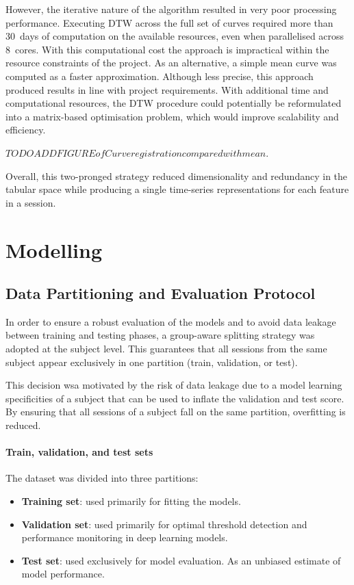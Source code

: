 However, the iterative nature of the algorithm resulted in very poor processing performance. Executing DTW across the full set of curves required more than 30~days of computation on the available resources, even when parallelised across 8~cores. With this computational cost the approach is impractical within the resource constraints of the project. As an alternative, a simple mean curve was computed as a faster approximation. Although less precise, this approach produced results in line with project requirements. With additional time and computational resources, the DTW procedure could potentially be reformulated into a matrix-based optimisation problem, which would improve scalability and efficiency.


$TODO ADD FIGURE of Curve registration compared with mean.$

Overall, this two-pronged strategy reduced dimensionality and redundancy in the tabular space while producing a single time-series representations for each feature in a session.


\section{Modelling}\label{sec:method-models}

\subsection{Data Partitioning and Evaluation Protocol}\label{subsec:method-eval-proto}
In order to ensure a robust evaluation of the models and to avoid data leakage between training and testing phases, a group-aware splitting strategy was adopted at the subject level. This guarantees that all sessions from the same subject appear exclusively in one partition (train, validation, or test).

This decision wsa motivated by the risk of data leakage due to a model learning specificities of a subject that can be used to inflate the validation and test score. By ensuring that all sessions of a subject fall on the same partition, overfitting is reduced.

\paragraph{Train, validation, and test sets}
The dataset was divided into three partitions:
\begin{itemize}
    \item \textbf{Training set}: used primarily for fitting the models.
    \item \textbf{Validation set}: used primarily for optimal threshold detection and performance monitoring in deep learning models.
    \item \textbf{Test set}: used exclusively for model evaluation. As an unbiased estimate of model performance.
\end{itemize}

